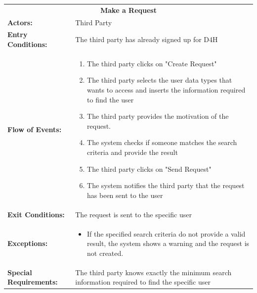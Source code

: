 \begin{table}[H]
	\centering
	{\renewcommand{\arraystretch}{1.5}%
		\begin{tabular}{|@{\hspace{2em}} p{4cm} @{}| p{11cm} @{\qquad}|}
			\cline{1-2}
			\multicolumn{2}{|c|}{\textbf{Make a Request}} \\ \cline{1-2}
			\textbf{Actors:} & Third Party \\ \cline{1-2}
			\textbf{Entry Conditions:} &  The third party has already signed up for D4H  \\ \cline{1-2}
			\textbf{Flow of Events:} & 
			\begin{enumerate}[itemsep=-0.2em, topsep=0em]
				\item The third party clicks on "Create Request"
				\item The third party selects the user data types that wants to access and inserts the information required to find the user
				\item The third party provides the motivation of the request.
				\item The system checks if someone matches the search criteria and provide the result
				\item The third party clicks on "Send Request"
				\item The system notifies the third party that the request has been sent to the user
			\end{enumerate}\\ \cline{1-2}
			\textbf{Exit Conditions:} & The request is sent to the specific user\\ \cline{1-2}
			\textbf{Exceptions:} & 
			\begin{itemize}[topsep=-2em, itemsep=-0.2em]
				\item If the specified search criteria do not provide a valid result, the system shows a warning and the request is not created.
			\end{itemize} \\ \cline{1-2}
			\textbf{Special Requirements:} & The third party knows exactly the minimum search information required to find the specific user \\ \hline
	\end{tabular}} \quad
\end{table}

